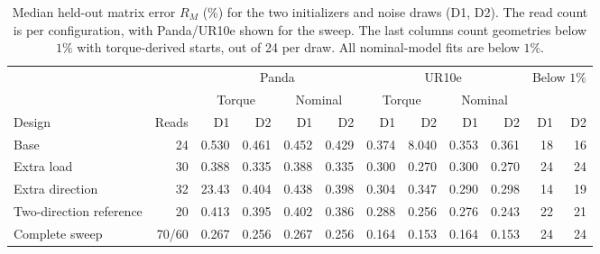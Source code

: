 \begin{table}[!tbp]
\centering
\small
\setlength{\tabcolsep}{3pt}
\caption{Median held-out matrix error \(R_M\) (\%) for the two initializers and noise draws (D1, D2). The read count is per configuration, with Panda/UR10e shown for the sweep. The last columns count geometries below \(1\%\) with torque-derived starts, out of 24 per draw. All nominal-model fits are below \(1\%\).}
\label{tab:sampling-summary}
\begin{tabular}{@{}lrrrrrrrrrrr@{}}
\toprule
& & \multicolumn{4}{c}{Panda} & \multicolumn{4}{c}{UR10e} & \multicolumn{2}{c}{Below \(1\%\)}\\
\cmidrule(lr){3-6}\cmidrule(lr){7-10}\cmidrule(lr){11-12}
& & \multicolumn{2}{c}{Torque} & \multicolumn{2}{c}{Nominal} & \multicolumn{2}{c}{Torque} & \multicolumn{2}{c}{Nominal} & & \\
\cmidrule(lr){3-4}\cmidrule(lr){5-6}\cmidrule(lr){7-8}\cmidrule(lr){9-10}
Design & Reads & D1 & D2 & D1 & D2 & D1 & D2 & D1 & D2 & D1 & D2\\
\midrule
Base & 24 & 0.530 & 0.461 & 0.452 & 0.429 & 0.374 & 8.040 & 0.353 & 0.361 & 18 & 16\\
Extra load & 30 & 0.388 & 0.335 & 0.388 & 0.335 & 0.300 & 0.270 & 0.300 & 0.270 & 24 & 24\\
Extra direction & 32 & 23.43 & 0.404 & 0.438 & 0.398 & 0.304 & 0.347 & 0.290 & 0.298 & 14 & 19\\
Two-direction reference & 20 & 0.413 & 0.395 & 0.402 & 0.386 & 0.288 & 0.256 & 0.276 & 0.243 & 22 & 21\\
Complete sweep & 70/60 & 0.267 & 0.256 & 0.267 & 0.256 & 0.164 & 0.153 & 0.164 & 0.153 & 24 & 24\\
\bottomrule
\end{tabular}
\end{table}
